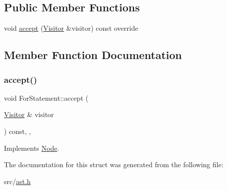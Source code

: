 \subsection*{Public Member Functions}
\begin{DoxyCompactItemize}
\item 
void \hyperlink{struct_for_statement_acc3a0ac5de61092f0d7be7921b31d47d}{accept} (\hyperlink{struct_visitor}{Visitor} \&visitor) const override
\end{DoxyCompactItemize}


\subsection{Member Function Documentation}
\mbox{\label{struct_for_statement_acc3a0ac5de61092f0d7be7921b31d47d}} 
\subsubsection{\texorpdfstring{accept()}{accept()}}
{\footnotesize\ttfamily void For\+Statement\+::accept (\begin{DoxyParamCaption}\item[{\hyperlink{struct_visitor}{Visitor} \&}]{visitor }\end{DoxyParamCaption}) const\hspace{0.3cm}{\ttfamily [inline]}, {\ttfamily [override]}, {\ttfamily [virtual]}}



Implements \hyperlink{struct_node_a10bd7af968140bbf5fa461298a969c71}{Node}.



The documentation for this struct was generated from the following file\+:\begin{DoxyCompactItemize}
\item 
src/\hyperlink{ast_8h}{ast.\+h}\end{DoxyCompactItemize}
